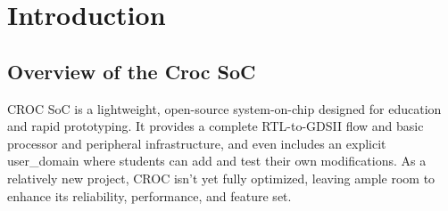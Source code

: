 
\chapter{Introduction}
\label{chap:introduction}

\section{Overview of the Croc SoC}
CROC SoC is a lightweight, open-source system-on-chip designed for education and rapid prototyping. It provides a complete RTL-to-GDSII flow and basic processor and peripheral infrastructure, and even includes an explicit user\_domain where students can add and test their own modifications. As a relatively new project, CROC isn’t yet fully optimized, leaving ample room to enhance its reliability, performance, and feature set.

